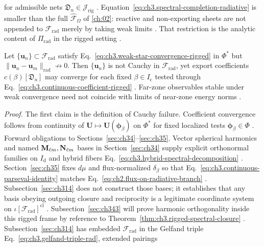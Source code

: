 for admissible nets \(\mathfrak{D}_n\in\mathcal{J}_{\mathrm{rig}}\) \cite{kato1995}.
Equation~\eqref{eq:ch3.spectral-completion-radiative} is smaller than the full
\(\widehat{\mathcal{F}}_\Omega\) of \ref{ch:02}: reactive and non-exporting sheets are not appended to
\(\mathcal{F}_{\mathrm{rad}}\) merely by taking weak limits \cite{stratton1941}. That restriction is the
analytic content of \(\Pi_{\mathrm{rad}}\) in the rigged setting \cite{harrington2001}.
\begin{proposition}
\label{prop:ch3.weak-norm-distinction}
Let \(\{\mathbf{u}_n\}\subset\mathcal{F}_{\mathrm{rad}}\) satisfy
Eq.~\eqref{eq:ch3.weak-star-convergence-rigged} in \(\Phi^{*}\) but
\(\|\mathbf{u}_n-\mathbf{u}_m\|_{\mathrm{rad}}\not\to 0\). Then \(\{\mathbf{u}_n\}\) is not Cauchy in
\(\mathcal{F}_{\mathrm{rad}}\), yet export coefficients
\(c(\beta)[\mathfrak{D}_n]\) may converge for each fixed \(\beta\in I_{\mathrm{c}}\) tested through
Eq.~\eqref{eq:ch3.continuous-coefficient-rigged} \cite{kato1995}. Far-zone
observables stable under weak convergence need not coincide with limits of near-zone energy norms
\cite{stratton1941}.
\end{proposition}
\noindent\textit{Proof.}
The first claim is the definition of Cauchy failure. Coefficient convergence follows from continuity of
\(\mathbf{U}\mapsto\mathbf{U}(\boldsymbol{\phi}_\beta)\) on \(\Phi^{*}\) for fixed localized tests
\(\boldsymbol{\phi}_\beta\in\Phi\) \cite{kato1995}.
Forward obligations to Sections~\ref{sec:ch34}--\ref{sec:ch35}. Vector spherical harmonics and named \(\mathbf{M}_{\ell m},\mathbf{N}_{\ell m}\) bases in Section~\ref{sec:ch34} supply explicit orthonormal
families on \(I_{\mathrm{d}}\) and hybrid fibers Eq.~\eqref{eq:ch3.hybrid-spectral-decomposition}
\cite{hansen1988}. Section~\ref{sec:ch35} fixes \(d\mu\) and flux-normalized
\(\delta_\beta\) so that Eq.~\eqref{eq:ch3.continuous-parseval-identity} matches
Eq.~\eqref{eq:ch2.flux-on-radiative-branch} \cite{stratton1941}. Subsection~\ref{sec:ch314} does
not construct those bases; it establishes that any basis obeying outgoing closure and reciprocity is a
legitimate coordinate system on \(\iota[\mathcal{F}_{\mathrm{rad}}]^{\mathrm{cl}}\) \cite{harrington2001}.
Subsection~\ref{sec:ch343} will prove harmonic orthogonality inside this rigged frame by reference to
Theorem~\ref{thm:ch3.rigged-spectral-closure} \cite{stratton1941}.
Subsection~\ref{sec:ch314} has embedded \(\mathcal{F}_{\mathrm{rad}}\) in the Gelfand triple
Eq.~\eqref{eq:ch3.gelfand-triple-rad}, extended pairings
